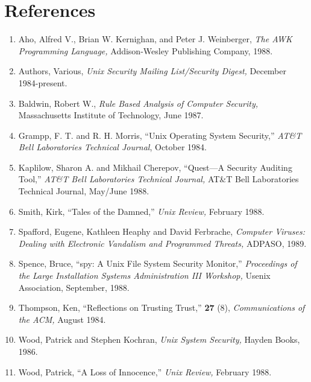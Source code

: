\section*{References}\frenchspacing
\begin{enumerate}
\item
Aho, Alfred V., Brian W. Kernighan, and Peter J. Weinberger, 
{\it The
AWK Programming Language,}
Addison-Wesley Publishing Company, 1988.

\item
Authors, Various, 
{\it {\sc Unix} Security Mailing List/Security Digest,}
December 1984-present.

\item
Baldwin, Robert W., 
{\it Rule Based Analysis of Computer Security,}
Massachusetts Institute of Technology, June 1987.

\item
Grampp, F. T. and R. H. Morris,  ``{\sc Unix} Operating System Security,''
{\it AT\&T Bell Laboratories Technical Journal}, October 1984.

\item
Kaplilow, Sharon A. and Mikhail Cherepov, ``Quest---A Security
Auditing Tool,''
{\it AT\&T Bell Laboratories Technical Journal,}
AT\&T Bell Laboratories Technical Journal, May/June 1988.

\item
Smith, Kirk, ``Tales of the Damned,''
{\it {\sc Unix} Review,}
February 1988.

\item
Spafford, Eugene, Kathleen Heaphy and David Ferbrache, 
{\it Computer
Viruses: Dealing with Electronic Vandalism and Programmed Threats,}
ADPASO, 1989.

\item
Spence, Bruce, ``spy: A {\sc Unix} File System Security Monitor,''
{\it Proceedings of the Large Installation Systems Administration III
Workshop,} Usenix Association,
September, 1988.

\item
Thompson, Ken, ``Reflections on Trusting Trust,''
{\bf 27}
(8),
{\it Communications of the ACM,}
August 1984.

\item
Wood, Patrick and Stephen Kochran, 
{\it {\sc Unix} System Security,}
Hayden
Books, 1986.

\item
Wood, Patrick, ``A Loss of Innocence,''
{\it {\sc Unix} Review,}
February 1988.
\end{enumerate}

